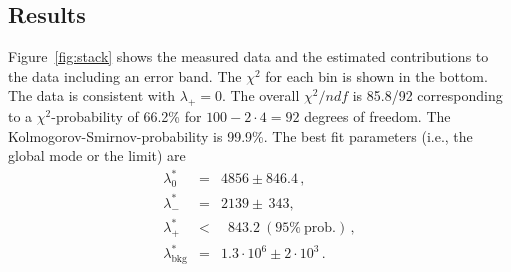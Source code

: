 \documentclass[11pt, a4paper]{article}
\begin{document}

\subsection{Results}

Figure~\ref{fig:stack} shows the measured data and the estimated
contributions to the data including an error band. The $\chi^{2}$ for
each bin is shown in the bottom. The data is consistent with
$\lambda_{+}=0$. The overall $\chi^{2}/ndf$ is 85.8/92 corresponding
to a $\chi^{2}$-probability of 66.2\% for $100-2\cdot4=92$ degrees of
freedom. The Kolmogorov-Smirnov-probability is 99.9\%. The best fit
parameters (i.e., the global mode or the limit) are
%
\begin{eqnarray*}
\lambda_{0}^{*}            & = & 4856 \pm 846.4 \, , \\
\lambda_{-}^{*}            & = & 2139 \pm  \, 343, \\
\lambda_{+}^{*}            & < & \phantom{0}843.2 \mathrm{~(95\%~prob.)} \, , \\
\lambda_{\mathrm{bkg}}^{*} & = & 1.3\cdot10^{6} \pm 2\cdot10^{3} \, .
\end{eqnarray*} 
\end{document}

